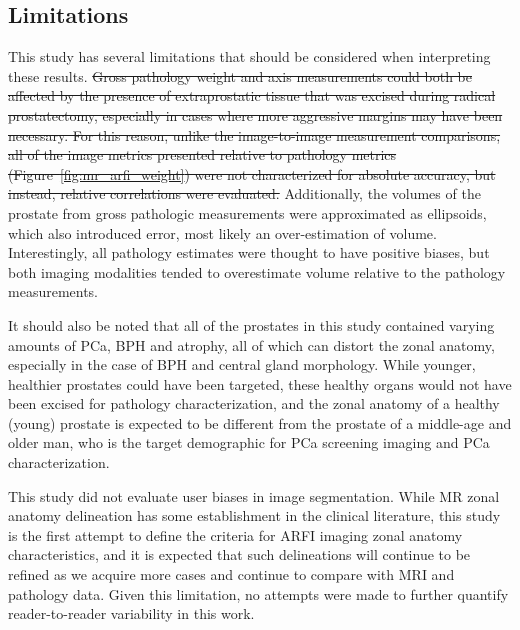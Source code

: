 \subsection{Limitations}
This study has several limitations that should be considered when interpreting
these results.  \st{Gross pathology weight and axis measurements could both be
affected by the presence of extraprostatic tissue that was excised during
radical prostatectomy, especially in cases where more aggressive margins may
have been necessary.  For this reason, unlike the image-to-image measurement
comparisons, all of the image metrics presented relative to pathology metrics
(Figure~\ref{fig:mr_arfi_weight}) were not characterized for absolute accuracy,
but instead, relative correlations were evaluated.}  Additionally, the volumes
of the prostate from gross pathologic measurements were approximated as
ellipsoids, which also introduced error, most likely an over-estimation of
volume.  Interestingly, all pathology estimates were thought to have positive
biases, but both imaging modalities tended to overestimate volume relative to
the pathology measurements.

It should also be noted that all of the prostates in this study contained
varying amounts of PCa, BPH and atrophy, all of which can distort the zonal
anatomy, especially in the case of BPH and central gland morphology.  While
younger, healthier prostates could have been targeted, these healthy organs
would not have been excised for pathology characterization, and the zonal
anatomy of a healthy (young) prostate is expected to be different from the
prostate of a middle-age and older man, who is the target demographic for PCa screening
imaging and PCa characterization. 

This study did not evaluate user biases in image segmentation.  While MR zonal
anatomy delineation has some establishment in the clinical literature, this
study is the first attempt to define the criteria for ARFI imaging zonal
anatomy characteristics, and it is expected that such delineations will
continue to be refined as we acquire more cases and continue to compare with
MRI and pathology data.  Given this limitation, no attempts were made to
further quantify reader-to-reader variability in this work.
